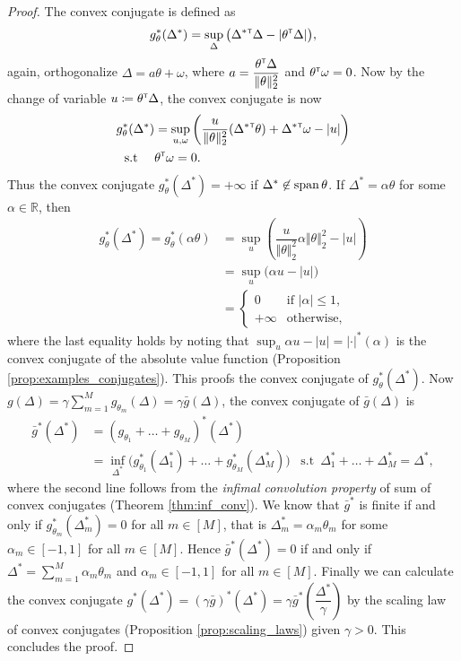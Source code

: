 \documentclass[12pt]{article}
\begin{document}
\begin{proof}
    The convex conjugate is defined as \[
    g_\theta^*(\Delta^*) = \sup_{\Delta} \big(\Delta^*{^{\scriptscriptstyle \sf T}}\Delta - |\theta^{\scriptscriptstyle \sf T}\Delta| \big),
    \]again, orthogonalize $\Delta = a \theta + \omega$, where $a = \dfrac{\theta^{\scriptscriptstyle \sf T} \Delta}{\Vert \theta\Vert_2^2}$ and $\theta^{\scriptscriptstyle \sf T}\omega = 0$. Now by the change of variable $u \coloneqq \theta^{\scriptscriptstyle \sf T}\Delta$, the convex conjugate is now \begin{align*}
        g^*_\theta(\Delta^*) &= \sup_{u,\omega}\left(\dfrac{u}{\Vert \theta\Vert_2^2}(\Delta^*{^{\scriptscriptstyle \sf T}}\theta) + \Delta^*{^{\scriptscriptstyle \sf T}}\omega - |u| \right)\\
        \text{s.t }\quad &\theta^{\scriptscriptstyle \sf T} \omega = 0.
    \end{align*}Thus the convex conjugate $g_\theta^*(\Delta^*) = + \infty$ if $\Delta^* \not\in \operatorname{span}{\theta}$. If $\Delta^* = \alpha \theta$ for some $\alpha\in\mathbb{R}$, then \begin{align*}
        g^*_\theta(\Delta^*) = g^*_\theta(\alpha\theta) &= \sup_{u} \left(\dfrac{u}{\Vert \theta\Vert_2^2 }\alpha \Vert \theta\Vert_2^2 - |u| \right)\\
        &= \sup_{u} \big( \alpha u - |u|\big)\\
        &= \begin{cases}
            0 &\text{if } |\alpha|\leq 1,\\
            +\infty &\text{otherwise,}
         \end{cases}
    \end{align*}
    where the last equality holds by noting that $\sup_u \alpha u - |u| = |\cdot|^*(\alpha)$ is the convex conjugate of the absolute value function (Proposition \ref{prop:examples_conjugates}). This proofs the convex conjugate of $g_\theta^*(\Delta^*)$. Now $g(\Delta) = \gamma \sum_{m=1}^M g_{\theta_m}(\Delta)=\gamma \bar{g}(\Delta)$, the convex conjugate of $\bar{g}(\Delta)$ is \begin{align*}
        \bar{g}^*(\Delta^*) &= (g_{\theta_1}+\ldots +g_{\theta_M})^*(\Delta^*) \\
        &=\inf_{\Delta^*} \big(g^*_{\theta_1}(\Delta^*_1) + \ldots + g_{\theta_M}^*(\Delta_M^*) \big) \,\,\, \text{ s.t}\,\,\, \Delta_1^* + \ldots +\Delta_M^* = \Delta^*,
    \end{align*}
    where the second line follows from the \textit{infimal convolution property} of sum of convex conjugates (Theorem \ref{thm:inf_conv}). We know that $\bar{g}^*$ is finite if and only if $g^*_{\theta_m}(\Delta_m^*) = 0$ for all $m\in[M]$, that is $\Delta_m^* = \alpha_m \theta_m$ for some $\alpha_m \in [-1,1]$ for all $m\in[M]$. Hence $\bar{g}^*(\Delta^*) = 0$ if and only if $\Delta^* = \sum_{m=1}^M\alpha_m \theta_m$ and $\alpha_m \in [-1,1]$ for all $m\in [M]$. Finally we can calculate the convex conjugate $g^*(\Delta^*) = (\gamma \bar{g})^*(\Delta^*) = 
 \gamma \bar{g}^*\left(\dfrac{\Delta^*}{\gamma} \right)$ by the scaling law of convex conjugates (Proposition \ref{prop:scaling_laws}) given $\gamma > 0$. This concludes the proof.
\end{proof}
\end{document}
